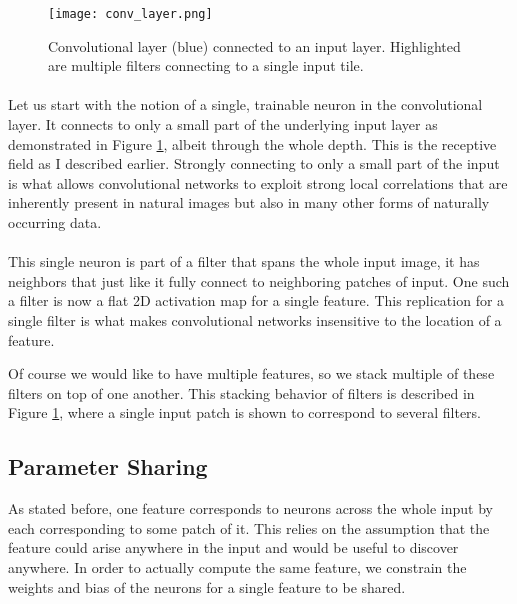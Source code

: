 \begin{figure}[htpb]
  \centering
  \texttt{[image: conv\_layer.png]}
  \caption{Convolutional layer (blue) connected to an input layer.
    Highlighted are multiple filters connecting to a single input tile.
  }
  \label{fig:conv_layer}
\end{figure}

\paragraph{}
Let us start with the notion of a single, trainable neuron
in the convolutional layer.
It connects to only a small part of
the underlying input layer
as demonstrated in
Figure \ref{fig:conv_layer},
albeit through the whole depth.
This is the receptive field
as I described earlier.
Strongly connecting to only a small part of the input
is what allows convolutional networks
to exploit strong local correlations
that are inherently present
in natural images
but also in many other forms of
naturally occurring data.

\paragraph{}
This single neuron is part of a filter
that spans the whole input image,
it has neighbors that just like it
fully connect to neighboring patches of input.
One such a filter is now a flat 2D activation map
for a single feature.
This replication for a single filter
is what makes convolutional networks
insensitive to the location of a feature.

Of course we would like to have multiple features,
so we stack multiple of these filters on top of one another.
This stacking behavior of filters is described in
Figure \ref{fig:conv_layer},
where a single input patch is shown to correspond
to several filters.

\subsection{Parameter Sharing}
\label{sub:parameter_sharing}
As stated before, one feature corresponds to neurons across
the whole input by each corresponding to some patch of it.
This relies on the assumption that the feature could arise
anywhere in the input and would be useful to discover anywhere.
In order to actually compute the same feature,
we constrain the weights and bias of the neurons for a single feature
to be shared.


